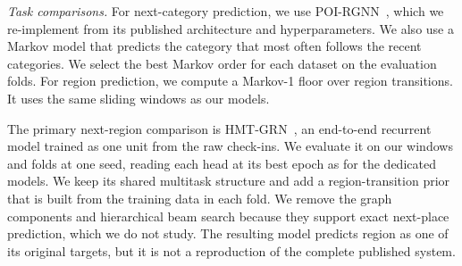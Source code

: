 \emph{Task comparisons.} For next-category prediction, we use POI-RGNN~\cite{capanema2023poirgnn}, which we re-implement from its published architecture and hyperparameters. We also use a Markov model that predicts the category that most often follows the recent categories. We select the best Markov order for each dataset on the evaluation folds. For region prediction, we compute a Markov-1 floor over region transitions. It uses the same sliding windows as our models.

The primary next-region comparison is HMT-GRN~\cite{Lim2022}, an end-to-end recurrent model trained as one unit from the raw check-ins. We evaluate it on our windows and folds at one seed, reading each head at its best epoch as for the dedicated models. We keep its shared multitask structure and add a region-transition prior that is built from the training data in each fold. We remove the graph components and hierarchical beam search because they support exact next-place prediction, which we do not study. The resulting model predicts region as one of its original targets, but it is not a reproduction of the complete published system.

